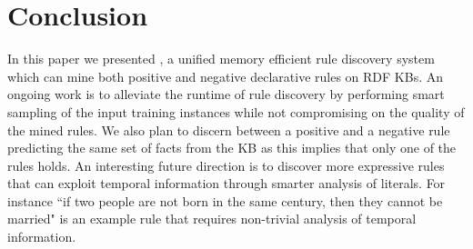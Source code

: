 \section{Conclusion}

In this paper we presented \krd, a unified memory efficient rule discovery system which can mine both positive and negative declarative rules on RDF KBs. 
An ongoing work is to alleviate the runtime of rule discovery by performing smart sampling of the input training instances while not compromising on the quality of the mined rules. We also plan to discern between a positive and a negative rule predicting the same set of facts from the KB as this implies that only one of the rules holds. 
An interesting future direction is to discover more expressive rules that can exploit temporal information through smarter analysis of literals. For instance ``if two people are not born in the same century, then they cannot be married" is an example rule that requires non-trivial analysis of temporal information. 


